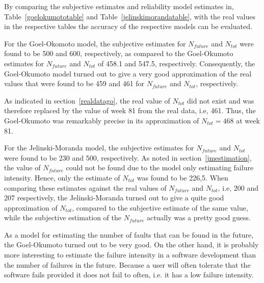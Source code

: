 By comparing the subjective estimates and reliability model estimates in, Table~\ref{goelokumototable} and Table~\ref{jelinskimorandatable}, with the real values in the respective tables the accuracy of the respective models can be evaluated. 

For the Goel-Okomoto model, the subjective estimates for $N_{future}$ and $N_{tot}$ were found to be 500 and 600, respectively, as compared to the Goel-Okumoto estimates for $N_{future}$ and $N_{tot}$ of 458.1 and 547.5, respectively. Consequently, the Goel-Okumoto model turned out to give a very good approximation of the real values that were found to be 459 and 461 for $N_{future}$ and $N_{tot}$, respectively. 

As indicated in section~\ref{realdatago}, the real value of $N_{tot}$ did not exist and was therefore replaced by the value of week 81 from the real data, i.e, 461. Thus, the Goel-Okumoto was remarkably precise in its approximation of $N_{tot}=468$ at week 81. 

For the Jelinski-Moranda model, the subjective estimates for $N_{future}$ and $N_{tot}$ were found to be 230 and 500, respectively. As noted in section~\ref{jmestimation}, the value of $N_{future}$ could not be found due to the model only estimating failure intensity. Hence, only the estimate of $N_{tot}$ was found to be 226,5. When comparing these estimates against the real values of $N_{future}$ and $N_{tot}$, i.e, 200 and 207 respectively, the Jelinski-Moranda turned out to give a quite good approximation of $N_{tot}$, compared to the subjective estimate of the same value, while the subjective estimation of the $N_{future}$ actually was a pretty good guess. 

As a model for estimating the number of faults that can be found in the future, the Goel-Okumoto turned out to be very good. On the other hand, it is probably more interesting to estimate the failure intensity in a software development than the number of failures in the future.
Because a user will often tolerate that the software fails provided it does not fail to often, i.e. it has a low failure intensity.